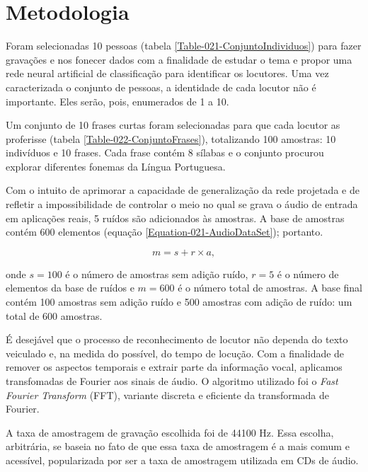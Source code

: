 
\section{Metodologia}

Foram selecionadas 10 pessoas (tabela \ref{Table-021-ConjuntoIndividuos})
para fazer gravações e nos fonecer dados com a finalidade de estudar o tema e
propor uma rede neural artificial de classificação para identificar os
locutores. Uma vez caracterizada o conjunto de pessoas, a identidade de cada
locutor não é importante. Eles serão, pois, enumerados de 1 a 10.

Um conjunto de 10 frases curtas foram selecionadas para que cada locutor as
proferisse (tabela \ref{Table-022-ConjuntoFrases}), totalizando 100 amostras:
10 indivíduos e 10 frases. Cada frase contém 8 sílabas e o conjunto procurou
explorar diferentes fonemas da Língua Portuguesa.

Com o intuito de aprimorar a capacidade de generalização da rede projetada e de
refletir a impossibilidade de controlar o meio no qual se grava o áudio de
entrada em aplicações reais, 5 ruídos são adicionados às amostras. A base de
amostras contém 600 elementos (equação \ref{Equation-021-AudioDataSet});
portanto.

{
\setlength{\belowdisplayskip}{0pt} \setlength{\belowdisplayshortskip}{0pt}
\setlength{\abovedisplayskip}{0pt} \setlength{\abovedisplayshortskip}{0pt}

\begin{equation}
  m = s + r \times a,
  \label{Equation-021-AudioDataSet}
\end{equation}
}

\noindent onde $s = 100$ é o número de amostras sem adição ruído, $r = 5$ é o
número de elementos da base de ruídos e $m = 600$ é o número total de amostras.
A base final contém 100 amostras sem adição ruído e 500 amostras com adição de
ruído: um total de 600 amostras.

É desejável que o processo de reconhecimento de locutor não dependa do texto
veiculado e, na medida do possível, do tempo de locução. Com a finalidade de
remover os aspectos temporais e extrair parte da informação vocal, aplicamos
transfomadas de Fourier aos sinais de áudio. O algoritmo utilizado foi o
\textit{Fast Fourier Transform} (FFT), variante discreta e eficiente da
transformada de Fourier.

A taxa de amostragem de gravação escolhida foi de 44100 Hz. Essa escolha,
arbitrária, se baseia no fato de que essa taxa de amostragem é a mais comum e
acessível, popularizada por ser a taxa de amostragem utilizada em CDs de áudio.

